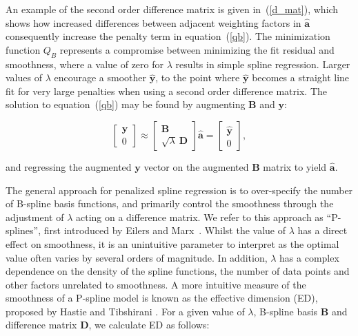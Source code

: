 \documentclass[num-refs]{wiley-article}
\begin{document}
An example of the second order difference matrix is given in~(\ref{d_mat}), which shows how increased differences between adjacent weighting factors in $\hat{\mathbf{a}}$ consequently increase the penalty term in equation~(\ref{qb}). The minimization function $Q_{B}$ represents a compromise between minimizing the fit residual and smoothness, where a value of zero for $\lambda$ results in simple spline regression. Larger values of $\lambda$ encourage a smoother $\hat{\mathbf{y}}$, to the point where $\hat{\mathbf{y}}$ becomes a straight line fit for very large penalties when using a second order difference matrix. The solution to equation~(\ref{qb}) may be found by augmenting $\mathbf{B}$ and $\mathbf{y}$:

\begin{equation}
  \begin{bmatrix}
    \mathbf{y} \\ 0
  \end{bmatrix}
  \approx
  \begin{bmatrix}
    \mathbf{B} \\ \sqrt{\lambda} \ \mathbf{D}
  \end{bmatrix} \hat{\mathbf{a}} =
  \begin{bmatrix}
    \hat{\mathbf{y}} \\ 0
  \end{bmatrix},
  \label{p-spline_eq}
\end{equation}

and regressing the augmented $\mathbf{y}$ vector on the augmented $\mathbf{B}$ matrix to yield $\hat{\mathbf{a}}$.

The general approach for penalized spline regression is to over-specify the number of B-spline basis functions, and primarily control the smoothness through the adjustment of $\lambda$ acting on a difference matrix. We refer to this approach as ``P-splines'', first introduced by Eilers and Marx~\cite{Eilers1996}. Whilst the value of $\lambda$ has a direct effect on smoothness, it is an unintuitive parameter to interpret as the optimal value often varies by several orders of magnitude. In addition, $\lambda$ has a complex dependence on the density of the spline functions, the number of data points and other factors unrelated to smoothness. A more intuitive measure of the smoothness of a P-spline model is known as the effective dimension (ED), proposed by Hastie and Tibshirani \cite{Hastie1990}. For a given value of $\lambda$, B-spline basis $\mathbf{B}$ and difference matrix $\mathbf{D}$, we calculate ED as follows:
\end{document}
